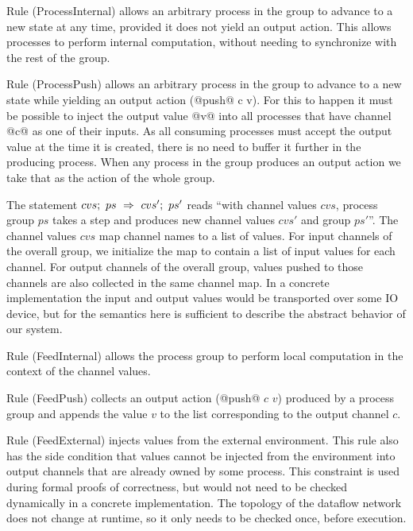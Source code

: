 Rule (ProcessInternal) allows an arbitrary process in the group to advance to a new state at any time, provided it does not yield an output action. This allows processes to perform internal computation, without needing to synchronize with the rest of the group.

Rule (ProcessPush) allows an arbitrary process in the group to advance to a new state while yielding an output action (@push@ c v). For this to happen it must be possible to inject the output value @v@ into all processes that have channel @c@ as one of their inputs. As all consuming processes must accept the output value at the time it is created, there is no need to buffer it further in the producing process. When any process in the group produces an output action we take that as the action of the whole group.

\smallskip
The statement $cvs;~ps~\Rightarrow~cvs';~ps'$ reads ``with channel values $cvs$, process group $ps$ takes a step and produces new channel values $cvs'$ and group $ps'$''. The channel values $cvs$ map channel names to a list of values. For input channels of the overall group, we initialize the map to contain a list of input values for each channel. For output channels of the overall group, values pushed to those channels are also collected in the same channel map. In a concrete implementation the input and output values would be transported over some IO device, but for the semantics here is sufficient to describe the abstract behavior of our system.

Rule (FeedInternal) allows the process group to perform local computation in the context of the channel values. 

Rule (FeedPush) collects an output action (@push@ $c$ $v$) produced by a process group and appends the value $v$ to the list corresponding to the output channel $c$. 

Rule (FeedExternal) injects values from the external environment. This rule also has the side condition that values cannot be injected from the environment into output channels that are already owned by some process. This constraint is used during formal proofs of correctness, but would not need to be checked dynamically in a concrete implementation. The topology of the dataflow network does not change at runtime, so it only needs to be checked once, before execution.


